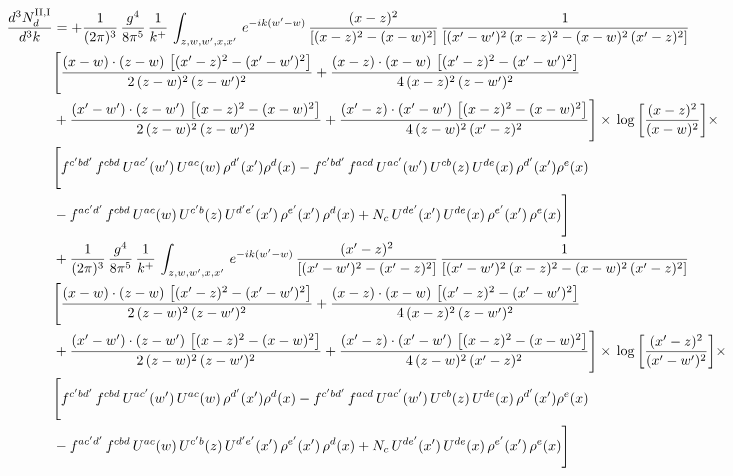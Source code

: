 \documentclass[9pt]{article}
\numberwithin{equation}{section}
\begin{document}
\begin{align}
 \frac{d^{3}N^{\rm II,I}_{d}}{d^{3}k}  & =   +\frac{1}{(2\pi)^{3}}\, \frac{g^{4}}{8\pi^{5}}\,\frac{1}{k^{+}}\,\int_{z,w,w^{\prime},x,x'}\, e^{-ik(w^{\prime}-w)}\,\frac{(x-z)^{2}}{\left[(x-z)^{2}-(x-w)^{2}\right]}\,\frac{1}{\left[(x'-w')^{2}\,(x-z)^{2} - (x-w)^{2}\,(x'-z)^{2}\right]}\notag \\ & \Bigg[\frac{(x-w)\cdot (z-w)\, \left[(x'-z)^{2}-(x'-w')^{2}\right]}{2\, (z-w)^{2}\, (z-w')^{2}}  + \frac{(x-z)\cdot (x-w)\,\left[(x'-z)^{2}-(x'-w')^{2}\right] }{4\,(x-z)^{2}\,(z-w')^{2}}\notag \\ & +\frac{(x'-w')\cdot (z-w')\, \left[(x-z)^{2}-(x-w)^{2}\right]}{2\, (z-w)^{2}\, (z-w')^{2}}+ \frac{(x'-z)\cdot (x'-w')\, \left[(x-z)^{2}-(x-w)^{2}\right]}{4\, (z-w)^{2}\,(x'-z)^{2}}\Bigg]\times\, \log{\left[\frac{(x-z)^{2}}{(x-w)^{2}}\right]} \times\notag \\ & \Bigg[f^{c'bd'}\,f^{cbd}\, U^{ac'}(w')\,U^{ac}(w)\,\rho^{d'}(x')\rho^{d}(x)- f^{c'bd'}\,f^{acd}\,U^{ac'}(w')\,U^{cb}(z)\,U^{de}(x)\,\rho^{d'}(x')\rho^{e}(x) \notag \\ & -f^{ac'd'}\,f^{cbd}\,U^{ac}(w)\,U^{c'b}(z)\,U^{d'e'}(x')\,\rho^{e'}(x')\,\rho^{d}(x) +N_{c}\,U^{de'}(x')\,U^{de}(x)\,\rho^{e'}(x')\,\rho^{e}(x)\Bigg] \notag \\
& +\frac{1}{(2\pi)^{3}}\, \frac{g^{4}}{8\pi^{5}}\,\frac{1}{k^{+}}\,\int_{z,w,w^{\prime},x,x'}\, e^{-ik(w^{\prime}-w)}\,\frac{(x'-z)^{2}}{\left[(x'-w')^{2}-(x'-z)^{2}\right]}\,\frac{1}{\left[(x'-w')^{2}\,(x-z)^{2} - (x-w)^{2}\,(x'-z)^{2}\right]}\notag \\ & \Bigg[\frac{(x-w)\cdot (z-w)\, \left[(x'-z)^{2}-(x'-w')^{2}\right]}{2\, (z-w)^{2}\, (z-w')^{2}}  + \frac{(x-z)\cdot (x-w)\,\left[(x'-z)^{2}-(x'-w')^{2}\right] }{4\,(x-z)^{2}\,(z-w')^{2}}\notag \\ & +\frac{(x'-w')\cdot (z-w')\, \left[(x-z)^{2}-(x-w)^{2}\right]}{2\, (z-w)^{2}\, (z-w')^{2}}+ \frac{(x'-z)\cdot (x'-w')\, \left[(x-z)^{2}-(x-w)^{2}\right]}{4\, (z-w)^{2}\,(x'-z)^{2}}\Bigg]\times\, \log{\left[\frac{(x'-z)^{2}}{(x'-w')^{2}}\right]} \times\notag \\ & \Bigg[f^{c'bd'}\,f^{cbd}\, U^{ac'}(w')\,U^{ac}(w)\,\rho^{d'}(x')\rho^{d}(x)- f^{c'bd'}\,f^{acd}\,U^{ac'}(w')\,U^{cb}(z)\,U^{de}(x)\,\rho^{d'}(x')\rho^{e}(x) \notag \\ & -f^{ac'd'}\,f^{cbd}\,U^{ac}(w)\,U^{c'b}(z)\,U^{d'e'}(x')\,\rho^{e'}(x')\,\rho^{d}(x) +N_{c}\,U^{de'}(x')\,U^{de}(x)\,\rho^{e'}(x')\,\rho^{e}(x)\Bigg]
\end{align}
\end{document}
